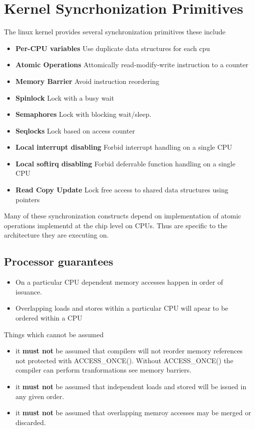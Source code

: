 \documentclass{article}
\begin{document}
\section{Kernel Syncrhonization Primitives}

The linux kernel provides several synchronization primitives these
include

\begin{itemize}
\item \textbf{Per-CPU variables}
  Use duplicate data structures for each cpu
\item \textbf{Atomic Operations}
  Attomically read-modify-write instruction to a counter
\item \textbf{Memory Barrier}
  Avoid instruction reordering
\item  \textbf{Spinlock}
  Lock with a busy wait
\item \textbf{Semaphores}
  Lock with blocking wait/sleep.
\item \textbf{Seqlocks}
  Lock based on access counter
\item \textbf{Local interrupt disabling}
  Forbid interrupt handling on a single CPU
\item \textbf{Local softirq disabling}
  Forbid deferrable function handling on a single CPU
\item \textbf{Read Copy Update}
  Lock free access to shared data structures using pointers
\end{itemize}

Many of these synchronization constructs depend on implementation of
atomic operations implementd at the chip level on CPUs. Thus are
specific to the architecture they are executing on.

\subsection{Processor guarantees}

\begin{itemize}
  \item On a particular CPU dependent memory accesses happen in order
    of issuance.

  \item Overlapping loads and stores within a particular CPU will
    apear to be ordered within a CPU
    
\end{itemize}

Things which cannot be assumed

\begin{itemize}
\item it \textbf{must not} be assumed that compilers will not reorder
  memory references not protected with ACCESS\_ONCE(). Without
  ACCESS\_ONCE() the compiler can perform tranformations see memory
  barriers.
\item it \textbf{must not} be assumed that independent loads and
  stored will be issued in any given order.
\item it \textbf{must not} be assumed that overlapping memroy accesses
  may be merged or discarded.  
\end{itemize}
\end{document}
